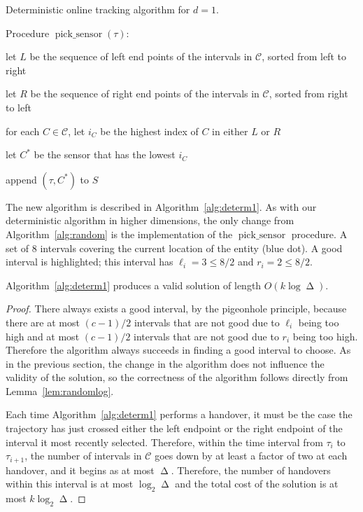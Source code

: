 \documentclass[runningheads]{llncs}
\newcommand {\script} [1] {\ensuremath {\mathcal {#1}}}
\DeclareMathOperator {\ply}{\Delta}
\DeclareMathOperator {\picksensor}{pick\_sensor}
\begin{document}
      \begin {algorithm} [ht]
        \caption {Deterministic online tracking algorithm for $d=1$.} \label {alg:determ1}
        Procedure $\picksensor (\tau)$:
        \begin {compactenum}
          \item let $L$ be the sequence of left end points of the intervals in $\script C$, sorted from left to right
          \item let $R$ be the sequence of right end points of the intervals in $\script C$, sorted from right to left
          \item for each $C \in \script C$, let $i_C$ be the highest index of $C$ in either $L$ or $R$
          \item let $C^*$ be the sensor that has the lowest $i_C$
          \item append $(\tau, C^*)$ to $S$
        \end {compactenum}
      \end{algorithm}      
      
      The new algorithm is described in Algorithm~\ref {alg:determ1}.
As with our deterministic algorithm in higher dimensions, the only change from  Algorithm~\ref {alg:random} is the implementation of the $\picksensor$ procedure.
       {A set of $8$ intervals covering the current location of the entity (blue dot). A good interval is highlighted; this interval has $\ell_i=3\le 8/2$ and $r_i=2\le 8/2$.}

      \begin {lemma} \label {lem:determlog}
        Algorithm~\ref {alg:determ1} produces a valid solution of length $O (k \log \ply)$.
      \end {lemma}
      
      \begin {proof}
       There always exists a good interval, by the pigeonhole principle, because there are at most $(c-1)/2$ intervals that are not good due to $\ell_i$ being too high and at most $(c-1)/2$ intervals that are not good due to $r_i$ being too high. Therefore the algorithm always succeeds in finding a good interval to choose.
        As in the previous section, the change in the algorithm does not influence the validity of the solution, so the correctness of the algorithm follows directly from Lemma~\ref {lem:randomlog}.

        Each time Algorithm~\ref{alg:determ1} performs a handover, it must be the case the trajectory has just crossed either the left endpoint or the right endpoint of the interval it most recently selected. Therefore, within the time interval from $\tau_i$ to $\tau_{i+1}$, the number of intervals in $\script C$ goes down by at least a factor of two at each handover, and it begins as at most $\ply$. Therefore, the number of handovers within this interval is at most $\log_2\ply$ and the total cost of the solution is at most $k\log_2\ply$.
      \end {proof}            
      
\end{document}
